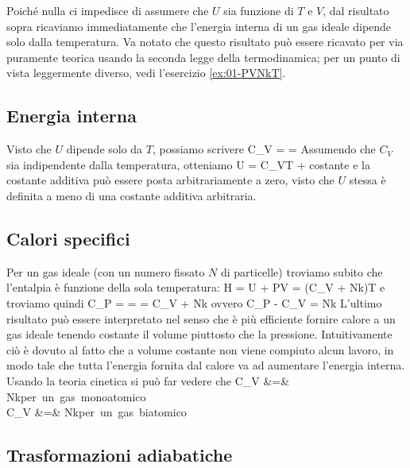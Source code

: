 Poiché nulla ci impedisce di assumere che $U$ sia funzione di $T$ e $V$, dal risultato sopra ricaviamo immediatamente che l'energia interna di un gas ideale dipende solo dalla temperatura. Va notato che questo risultato può essere ricavato per via puramente teorica usando la seconda legge della termodinamica; per un punto di vista leggermente diverso, vedi l'esercizio \ref{ex:01-PVNkT}.

\subsection{Energia interna}
Visto che $U$ dipende solo da $T$, possiamo scrivere
\be
C_{V} =  = 
\ee
Assumendo che $C_{V}$ sia indipendente dalla temperatura, otteniamo 
\be
U = C_{V}T + \textrm{costante}
\ee
e la costante additiva può essere posta arbitrariamente a zero, visto che $U$ stessa è definita a meno di una costante additiva arbitraria.

\subsection{Calori specifici}
Per un gas ideale (con un numero fissato $N$ di particelle) troviamo subito che l'entalpia è funzione della sola temperatura:
\be
H = U + PV = (C_{V} + Nk)T
\ee
e troviamo quindi
\be
C_{P} =  =  = C_{V} + Nk
\ee
ovvero
\be
\label{eq:01-diff-cs}
C_{P} - C_{V} = Nk
\ee
L'ultimo risultato può essere interpretato nel senso che è più efficiente fornire calore a un gas ideale tenendo costante il volume piuttosto che la pressione. Intuitivamente ciò è dovuto al fatto che a volume costante non viene compiuto alcun lavoro, in modo tale che tutta l'energia fornita dal calore va ad aumentare l'energia interna. Usando la teoria cinetica si può far vedere che
\bea
\label{eq:01-cv-mono-bi}
C_{V} &=&  Nk\qquad\mbox{per un gas monoatomico}\\
C_{V} &=&  Nk\qquad\mbox{per un gas biatomico}\\
\eea

\subsection{Trasformazioni adiabatiche}

